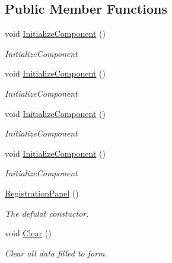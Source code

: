 \subsection*{Public Member Functions}
\begin{DoxyCompactItemize}
\item 
void \mbox{\hyperlink{class_wpf_handler_1_1_u_i_1_1_controls_1_1_logon_1_1_registration_panel_a32e00deb7cab659d0c7b677bc32bea18}{Initialize\+Component}} ()
\begin{DoxyCompactList}\small\item\em Initialize\+Component \end{DoxyCompactList}\item 
void \mbox{\hyperlink{class_wpf_handler_1_1_u_i_1_1_controls_1_1_logon_1_1_registration_panel_a32e00deb7cab659d0c7b677bc32bea18}{Initialize\+Component}} ()
\begin{DoxyCompactList}\small\item\em Initialize\+Component \end{DoxyCompactList}\item 
void \mbox{\hyperlink{class_wpf_handler_1_1_u_i_1_1_controls_1_1_logon_1_1_registration_panel_a32e00deb7cab659d0c7b677bc32bea18}{Initialize\+Component}} ()
\begin{DoxyCompactList}\small\item\em Initialize\+Component \end{DoxyCompactList}\item 
void \mbox{\hyperlink{class_wpf_handler_1_1_u_i_1_1_controls_1_1_logon_1_1_registration_panel_a32e00deb7cab659d0c7b677bc32bea18}{Initialize\+Component}} ()
\begin{DoxyCompactList}\small\item\em Initialize\+Component \end{DoxyCompactList}\item 
\mbox{\hyperlink{class_wpf_handler_1_1_u_i_1_1_controls_1_1_logon_1_1_registration_panel_a51c83efa00ed6ca56e65be059adc76b8}{Registration\+Panel}} ()
\begin{DoxyCompactList}\small\item\em The defulat constuctor. \end{DoxyCompactList}\item 
void \mbox{\hyperlink{class_wpf_handler_1_1_u_i_1_1_controls_1_1_logon_1_1_registration_panel_a0cedeb04a8dd51c128dfb4f44d9dd5fa}{Clear}} ()
\begin{DoxyCompactList}\small\item\em Clear all data filled to form. \end{DoxyCompactList}\end{DoxyCompactItemize}
